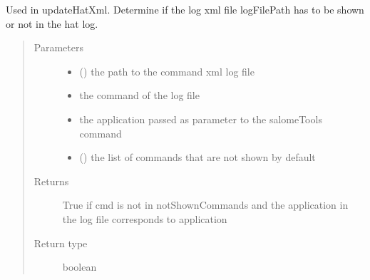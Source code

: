 \documentclass[a4paper,10pt,english]{sphinxmanual}
\begin{document}
\begin{fulllineitems}
\label{\detokenize{commands/apidoc/src:src.logger.show_command_log}}
Used in updateHatXml. 
Determine if the log xml file logFilePath 
has to be shown or not in the hat log.
\begin{quote}\begin{description}
\item[{Parameters}] \leavevmode\begin{itemize}
\item {} 
 () \textendash{} the path to the command xml log file

\item {} 
 \textendash{} the command of the log file

\item {} 
 \textendash{} the application passed as parameter 
to the salomeTools command

\item {} 
 () \textendash{} the list of commands 
that are not shown by default

\end{itemize}

\item[{Returns}] \leavevmode
True if cmd is not in notShownCommands and the application 
in the log file corresponds to application

\item[{Return type}] \leavevmode
boolean

\end{description}\end{quote}

\end{fulllineitems}

\end{document}

